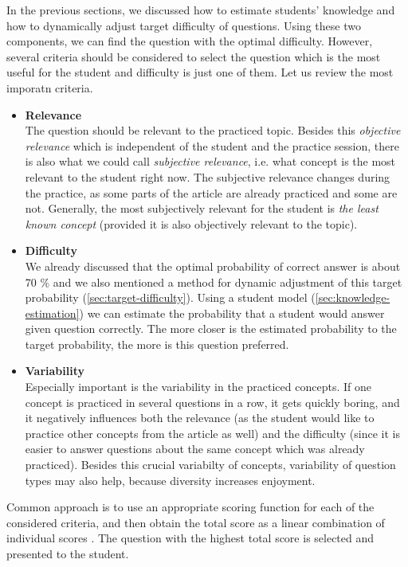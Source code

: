 \documentclass[a4paper, 12pt, twoside]{fithesis2}		%
\renewcommand{\_}{\leavevmode \kern0.07em\vbox{\hrule width0.4em}}
\newcommand{\squarebullet}{\textcolor{black}{\raisebox{0.15em}{\rule{4pt}{4pt}}}}
\newcommand{\emptysquarebullet}{\textcolor{black}{\raisebox{0.10em}{\tiny$\square$}}}
\newenvironment{myItemize}{
  \begin{itemize}[leftmargin=2em,rightmargin=1em,itemsep=\parskip ,parsep=0em,topsep=0em,partopsep=0em]
  \renewcommand{\labelitemi}{\squarebullet}
  \renewcommand{\labelitemii}{\textbullet}
}{
  \end{itemize}
}
\begin{document}
In the previous sections, we discussed how to estimate students' knowledge and how to dynamically adjust target difficulty of questions.
Using these two components, we can find the question with the optimal difficulty.
However, several criteria should be considered to select the question which is the most useful for the student and difficulty is just one of them. Let us review the most imporatn criteria.
\begin{myItemize}
  \item \textbf{Relevance}\\
    The question should be relevant to the practiced topic.
    Besides this \emph{objective relevance} which is independent of the student and the practice session,
    there is also what we could call \emph{subjective relevance}, i.e. what concept is the most relevant to the student right now.
    The subjective relevance changes during the practice, as some parts of the article are already practiced and some are not.
    Generally, the most subjectively relevant for the student is
    \emph{the least known concept} \cite{question-gen-adapt-bayes}
    (provided it is also objectively relevant to the topic).

  \item \textbf{Difficulty}\\
    We already discussed that the optimal probability of correct answer is about 70 \% and we also mentioned a method for dynamic adjustment of this target probability (\autoref{sec:target-difficulty}).
    Using a student model (\autoref{sec:knowledge-estimation}) we can estimate the probability that a student would answer given question correctly.
    The more closer is the estimated probability to the target probability, the more is this question preferred.

  \item \textbf{Variability}\\
    Especially important is the variability in the practiced concepts.
    If one concept is practiced in several questions in a row, it gets quickly boring, and it negatively influences both the relevance (as the student would like to practice other concepts from the article as well) and the difficulty (since it is easier to answer questions about the same concept which was already practiced).
    Besides this crucial variabilty of concepts,
    variability of question types may also help, because diversity increases enjoyment.
\end{myItemize}
Common approach is to use an appropriate scoring function for each of the considered criteria, and then obtain the total score as a linear combination of individual scores \cite{slepe-mapy}.
The question with the highest total score is selected and presented to the student.
\end{document}
